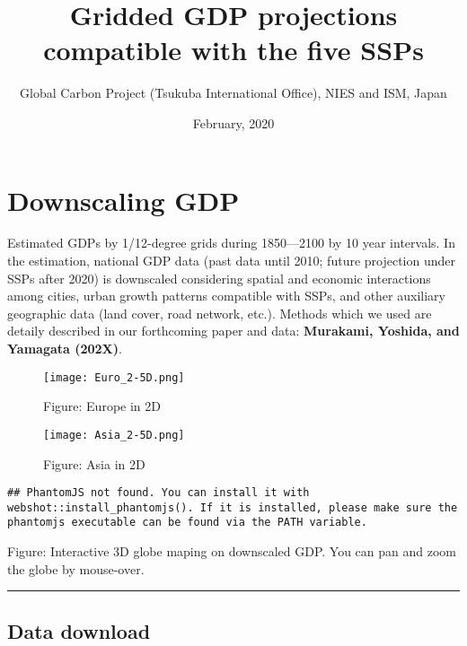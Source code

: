 \documentclass[]{book}
\title{Gridded GDP projections compatible with the five SSPs}
\author{Global Carbon Project (Tsukuba International Office), NIES and ISM, Japan}
\date{February, 2020}
\begin{document}
\maketitle

{
\setcounter{tocdepth}{1}
\tableofcontents
}
\hypertarget{downscaling-gdp}{%
\chapter*{Downscaling GDP}\label{downscaling-gdp}}

Estimated GDPs by 1/12-degree grids during 1850---2100 by 10 year intervals. In the estimation, national GDP data (past data until 2010; future projection under SSPs after 2020) is downscaled considering spatial and economic interactions among cities, urban growth patterns compatible with SSPs, and other auxiliary geographic data (land cover, road network, etc.). Methods which we used are detaily described in our forthcoming paper and data: \textbf{Murakami, Yoshida, and Yamagata (202X)}.

\begin{figure}
\centering
\texttt{[image: Euro\_2-5D.png]}
\caption{Figure: Europe in 2D}
\end{figure}

\begin{figure}
\centering
\texttt{[image: Asia\_2-5D.png]}
\caption{Figure: Asia in 2D}
\end{figure}

\begin{verbatim}
## PhantomJS not found. You can install it with webshot::install_phantomjs(). If it is installed, please make sure the phantomjs executable can be found via the PATH variable.
\end{verbatim}

\hypertarget{6I73q6Jdku}{}

Figure: Interactive 3D globe maping on downscaled GDP. You can pan and zoom the globe by mouse-over.

\begin{center}\rule{0.5\linewidth}{\linethickness}\end{center}

\hypertarget{data-download}{%
\section*{Data download}\label{data-download}}
\end{document}
